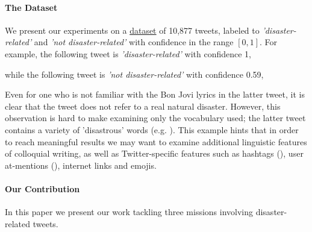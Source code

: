 \documentclass[letterpaper,twocolumn,10pt]{article}
\begin{document}
\paragraph{The Dataset}
We present our experiments on a \href{https://www.crowdflower.com/data-for-everyone/}{dataset} of 10,877 tweets, labeled to \textit{'disaster-related'} and \textit{'not disaster-related'} with confidence in the range $[0,1]$. For example, the following tweet is \textit{'disaster-related'} with confidence 1,

\begin{center}
	\parbox{190pt}{}
\end{center}


while the following tweet is \textit{'not disaster-related'} with confidence 0.59,

\begin{center}
	\parbox{190pt}{}
\end{center}

Even for one who is not familiar with the Bon Jovi lyrics in the latter tweet, it is clear that the tweet does not refer to a real natural disaster. However, this observation is hard to make examining only the vocabulary used; the latter tweet contains a variety of 'disastrous' words  (e.g. ). This example hints that in order to reach meaningful results we may want to examine additional linguistic features of colloquial writing,  as well as Twitter-specific features such as hashtags (\tweet{\textbf{\#}}), user at-mentions (), internet links and emojis.


\paragraph{Our Contribution}

In this paper we present our work tackling three missions involving disaster-related tweets.
\end{document}
